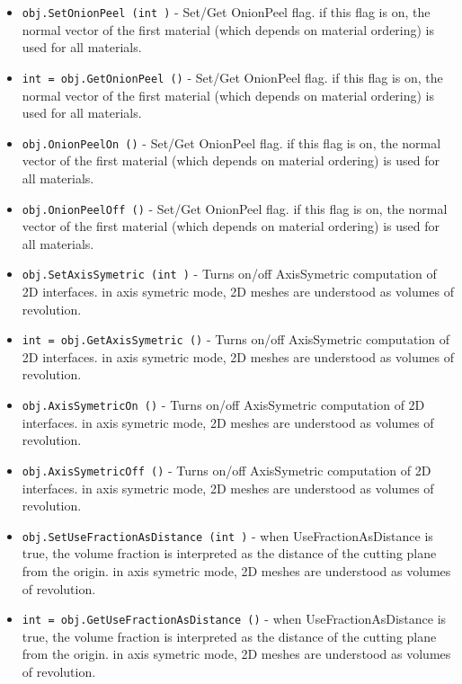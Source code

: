 \begin{itemize}
\item  \verb|obj.SetOnionPeel (int )| -  Set/Get OnionPeel flag. if this flag is on, the normal vector of the first 
 material (which depends on material ordering) is used for all materials.

\item  \verb|int = obj.GetOnionPeel ()| -  Set/Get OnionPeel flag. if this flag is on, the normal vector of the first 
 material (which depends on material ordering) is used for all materials.

\item  \verb|obj.OnionPeelOn ()| -  Set/Get OnionPeel flag. if this flag is on, the normal vector of the first 
 material (which depends on material ordering) is used for all materials.

\item  \verb|obj.OnionPeelOff ()| -  Set/Get OnionPeel flag. if this flag is on, the normal vector of the first 
 material (which depends on material ordering) is used for all materials.

\item  \verb|obj.SetAxisSymetric (int )| -  Turns on/off AxisSymetric computation of 2D interfaces. 
 in axis symetric mode, 2D meshes are understood as volumes of revolution.

\item  \verb|int = obj.GetAxisSymetric ()| -  Turns on/off AxisSymetric computation of 2D interfaces. 
 in axis symetric mode, 2D meshes are understood as volumes of revolution.

\item  \verb|obj.AxisSymetricOn ()| -  Turns on/off AxisSymetric computation of 2D interfaces. 
 in axis symetric mode, 2D meshes are understood as volumes of revolution.

\item  \verb|obj.AxisSymetricOff ()| -  Turns on/off AxisSymetric computation of 2D interfaces. 
 in axis symetric mode, 2D meshes are understood as volumes of revolution.

\item  \verb|obj.SetUseFractionAsDistance (int )| -  when UseFractionAsDistance is true, the volume fraction is interpreted as the distance
 of the cutting plane from the origin.
 in axis symetric mode, 2D meshes are understood as volumes of revolution.

\item  \verb|int = obj.GetUseFractionAsDistance ()| -  when UseFractionAsDistance is true, the volume fraction is interpreted as the distance
 of the cutting plane from the origin.
 in axis symetric mode, 2D meshes are understood as volumes of revolution.


\end{itemize}

